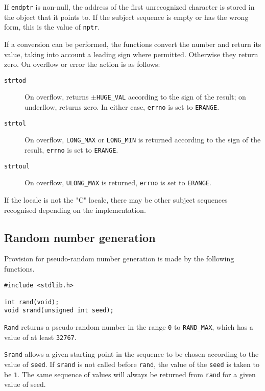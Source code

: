    If \texttt{endptr} is non-null, the address of the first unrecognized
    character is stored in the object that it points to.  If the subject
    sequence is empty or has the wrong form, this is the value of
    \texttt{nptr}.


   If a conversion can be performed, the functions convert  the number  and
    return its value, taking into account a leading sign where  permitted.
    Otherwise  they  return  zero.   On overflow or error the action is as
    follows:


   \begin{description}
    \item[\texttt{strtod}] On overflow, returns $\pm$\texttt{HUGE\_VAL} according to the
     sign  of the  result; on underflow, returns zero.  In either case,
     \texttt{errno} is set to \texttt{ERANGE}.

    \item[\texttt{strtol}] On overflow, \texttt{LONG\_MAX} or \texttt{LONG\_MIN} is
     returned  according to the sign of the result, \texttt{errno} is set
     to \texttt{ERANGE}.

    \item[\texttt{strtoul}] On overflow, \texttt{ULONG\_MAX}  is  returned,  \texttt{errno}
     is  set  to \texttt{ERANGE}.
   \end{description}

   If the locale is not the "C"  locale,  there  may  be  other subject
    sequences    recognised    depending    on    the implementation.


  

  \subsection{Random number generation}
   

   Provision for pseudo-random number generation is made by the
    following functions.


   \begin{Verbatim}
#include <stdlib.h>

int rand(void);
void srand(unsigned int seed);
\end{Verbatim}

   \texttt{Rand} returns a  pseudo-random  number  in  the  range
    \texttt{0}  to \texttt{RAND\_MAX}, which has a value of at least
    \texttt{32767}.


   \texttt{Srand} allows a given starting point in the  sequence  to  be
    chosen  according  to  the  value  of \texttt{seed}.  If
    \texttt{srand} is not called before \texttt{rand}, the value of the
    \texttt{seed} is taken to be  \texttt{1}.  The  same  sequence  of
    values will always be returned from \texttt{rand} for a given value of
    seed.


